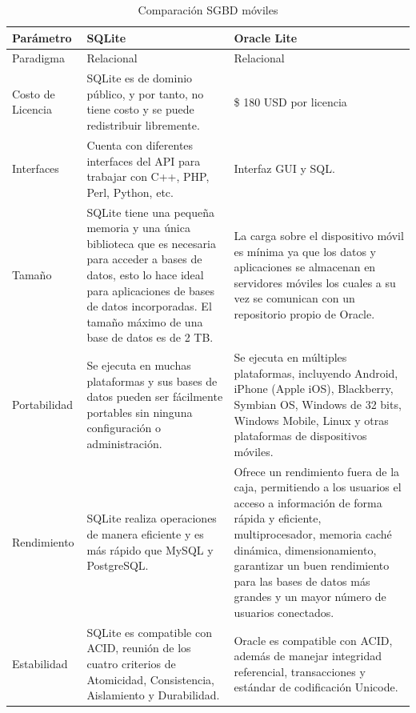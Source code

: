 \begin{table}[h!]
	\begin{center}
		\begin{tabular}{|p{3cm}|p{5.1cm}|p{5.1cm}|}
			\hline \rowcolor[RGB]{51,153,255} 
			\textcolor{blanco}{\bf Parámetro} &
				\textcolor{blanco}{\bf SQLite} &
				\textcolor{blanco}{\bf Oracle Lite} \\
			\hline 
				Paradigma &
				Relacional &
				Relacional \\
      		\hline \rowcolor[RGB]{240,248,255}
      			Costo de Licencia &
				SQLite es de dominio público, y por tanto, no tiene costo y se puede redistribuir libremente. &
				\$ 180 USD por licencia \\
      		\hline 
      			Interfaces &
				Cuenta con diferentes interfaces del API para trabajar con C++, PHP, Perl, Python, etc. &
				Interfaz GUI y SQL. \\
      		\hline \rowcolor[RGB]{240,248,255}
      			Tamaño &
				SQLite tiene una pequeña memoria y una única biblioteca que es necesaria para acceder a bases de datos, esto lo hace ideal para aplicaciones de bases de datos incorporadas. El tamaño máximo de una base de datos es de 2 TB. &
				 La carga sobre el dispositivo móvil es mínima ya que los datos y aplicaciones se almacenan en servidores móviles los cuales a su vez se comunican con un repositorio propio de Oracle. \\
      		\hline 
      		Portabilidad &
      		Se ejecuta en muchas plataformas y sus bases de datos pueden ser fácilmente portables sin ninguna configuración o administración. &
      		Se ejecuta en múltiples plataformas, incluyendo Android, iPhone (Apple iOS), Blackberry, Symbian OS, Windows de 32 bits, Windows Mobile, Linux y otras plataformas de dispositivos móviles. \\
      		\hline \rowcolor[RGB]{240,248,255}
      		Rendimiento &
      		SQLite realiza operaciones de manera eficiente y es más rápido que MySQL y PostgreSQL. &
      		Ofrece un rendimiento fuera de la caja, permitiendo a los usuarios el acceso a información de forma rápida y eficiente, multiprocesador, memoria caché dinámica, dimensionamiento, garantizar un buen rendimiento para las bases de datos más grandes y un mayor número de usuarios conectados. \\ 
      		\hline 
      		Estabilidad &
      		SQLite es compatible con ACID, reunión de los cuatro criterios de Atomicidad, Consistencia, Aislamiento y Durabilidad. &
      		Oracle es compatible con ACID, además de manejar integridad referencial, transacciones y  estándar de codificación Unicode. \\
      		\hline
    		\end{tabular}
	\end{center}
	\caption[Comparación SGBD móviles]{Comparación SGBD móviles} 
	\label{tab:comSGBD}
\end{table}

